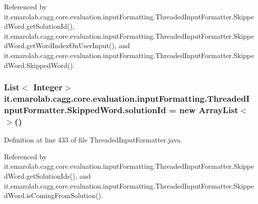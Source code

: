 Referenced by it.\-emarolab.\-cagg.\-core.\-evaluation.\-input\-Formatting.\-Threaded\-Input\-Formatter.\-Skipped\-Word.\-get\-Solution\-Id(), it.\-emarolab.\-cagg.\-core.\-evaluation.\-input\-Formatting.\-Threaded\-Input\-Formatter.\-Skipped\-Word.\-get\-Word\-Index\-On\-User\-Input(), and it.\-emarolab.\-cagg.\-core.\-evaluation.\-input\-Formatting.\-Threaded\-Input\-Formatter.\-Skipped\-Word.\-Skipped\-Word().

\hypertarget{classit_1_1emarolab_1_1cagg_1_1core_1_1evaluation_1_1inputFormatting_1_1ThreadedInputFormatter_1_1SkippedWord_a20a055dc4953f901364bd503f8101b8d}{
\subsubsection[{solution\-Id}]{\setlength{\rightskip}{0pt plus 5cm}List$<$ Integer$>$ it.\-emarolab.\-cagg.\-core.\-evaluation.\-input\-Formatting.\-Threaded\-Input\-Formatter.\-Skipped\-Word.\-solution\-Id = new Array\-List$<$$>$()\hspace{0.3cm}{\ttfamily [private]}}}\label{classit_1_1emarolab_1_1cagg_1_1core_1_1evaluation_1_1inputFormatting_1_1ThreadedInputFormatter_1_1SkippedWord_a20a055dc4953f901364bd503f8101b8d}


Definition at line 433 of file Threaded\-Input\-Formatter.\-java.



Referenced by it.\-emarolab.\-cagg.\-core.\-evaluation.\-input\-Formatting.\-Threaded\-Input\-Formatter.\-Skipped\-Word.\-get\-Solution\-Ids(), and it.\-emarolab.\-cagg.\-core.\-evaluation.\-input\-Formatting.\-Threaded\-Input\-Formatter.\-Skipped\-Word.\-is\-Coming\-From\-Solution().

